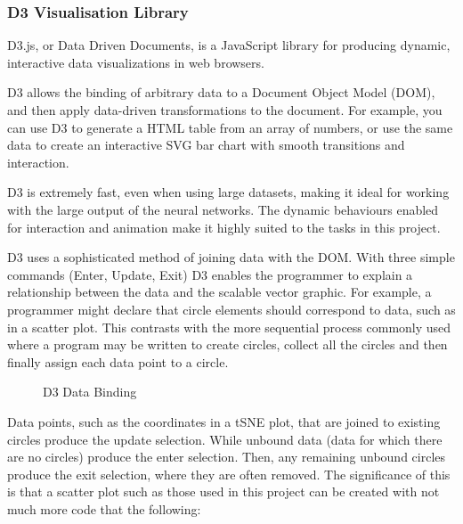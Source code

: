 \documentclass[a4paper,11pt,titlepage]{article}
\begin{document}
		\subsubsection{D3 Visualisation Library}
		D3.js, or Data Driven Documents, is a JavaScript library for producing dynamic, interactive data visualizations in web browsers.
		\par 
		D3 allows the binding of arbitrary data to a Document Object Model (DOM), and then apply data-driven transformations to the document. For example, you can use D3 to generate a HTML table from an array of numbers, or use the same data to create an interactive SVG bar chart with smooth transitions and interaction\cite{Bostock2011a}.
		\par
		D3 is extremely fast, even when using large datasets, making it ideal for working with the large output of the neural networks. The dynamic behaviours enabled for interaction and animation make it highly suited to the tasks in this project.
		\par 
	D3 uses a sophisticated method of joining data with the DOM. With three simple commands (Enter, Update, Exit) D3 enables the programmer to explain a relationship between the data and the scalable vector graphic. For example, a programmer might declare that circle elements should correspond to data, such as in a scatter plot. This contrasts with the more sequential process commonly used where a program may be written to create circles, collect all the circles and then finally assign each data point to a circle.
	
	\begin{figure}[H]
    			\caption{D3 Data Binding}%
	\end{figure}	
	
	Data points, such as the coordinates in a tSNE plot, that are joined to existing circles produce the update selection. While unbound data (data for which there are no circles) produce the enter selection. Then, any remaining unbound circles produce the exit selection, where they are often removed. The significance of this is that a scatter plot such as those used in this project can be created with not much more code that the following:
	
\end{document}
